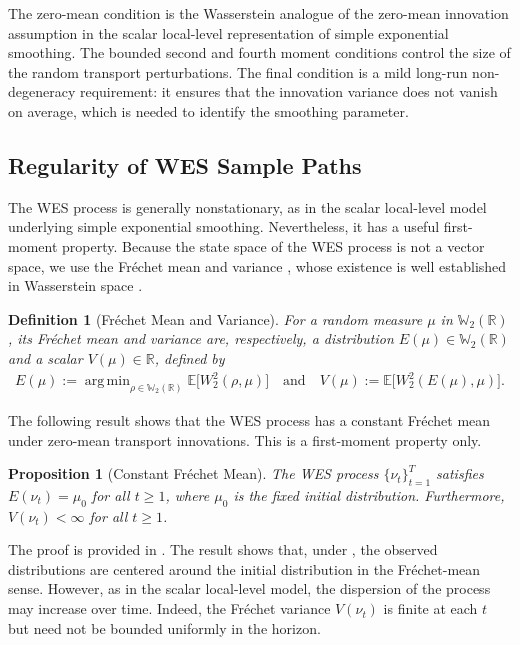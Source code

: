 \documentclass[a4paper, 11pt]{article}
\newcommand{\R}{\mathbb{R}}
\newcommand{\E}{\mathbb E}
\DeclareMathOperator*{\argmin}{arg\,min}
\newtheorem{proposition}{Proposition}
\newtheorem{definition}{Definition}
\theoremstyle{definition}
\begin{document}
The zero-mean condition is the Wasserstein analogue of the zero-mean innovation assumption in the scalar local-level representation of simple exponential smoothing.
The bounded second and fourth moment conditions control the size of the random transport perturbations.
The final condition is a mild long-run non-degeneracy requirement: it ensures that the innovation variance does not vanish on average, which is needed to identify the smoothing parameter.

\subsection{Regularity of WES Sample Paths} \label{sec:sample_path_regularity}

The WES process is generally nonstationary, as in the scalar local-level model underlying simple exponential smoothing.
Nevertheless, it has a useful first-moment property.
Because the state space of the WES process is not a vector space, we use the Fr\'{e}chet mean and variance \citep{Frechet1948}, whose existence is well established in Wasserstein space \citep{Panaretos2020}.

\begin{definition}[Fr\'{e}chet Mean and Variance]
	For a random measure $\mu$ in $\mathbb{W}_2(\mathbb{R})$, its Fr\'{e}chet mean and variance are, respectively, a distribution $E(\mu) \in \mathbb{W}_2(\mathbb{R})$ and a scalar $V(\mu) \in \R$, defined by
	\begin{align}
		E(\mu) := \argmin_{ \rho \in \mathbb{W}_2(\mathbb{R}) } \E \big[ W_2^2(\rho, \mu) \big] \quad \text{and} \quad V(\mu) := \E \big[ W_2^2(E(\mu), \mu) \big] .
	\end{align}
\end{definition}

The following result shows that the WES process has a constant Fr\'echet mean under zero-mean transport innovations.
This is a first-moment property only.

\begin{proposition}[Constant Fr\'{e}chet Mean] \label{prop:stationarity}
	The WES process $\{ \nu_t \}_{t=1}^{T}$ satisfies $E(\nu_t) = {\mu}_0$ for all $t \ge 1$, where ${\mu}_0$ is the fixed initial distribution.
    Furthermore, $V(\nu_t) < \infty$ for all $t \ge 1$.
\end{proposition}

The proof is provided in .
The result shows that, under , the observed distributions are centered around the initial distribution in the Fr\'echet-mean sense.
However, as in the scalar local-level model, the dispersion of the process may increase over time.
Indeed, the Fr\'{e}chet variance $V(\nu_t)$ is finite at each $t$ but need not be bounded uniformly in the horizon.
\end{document}
